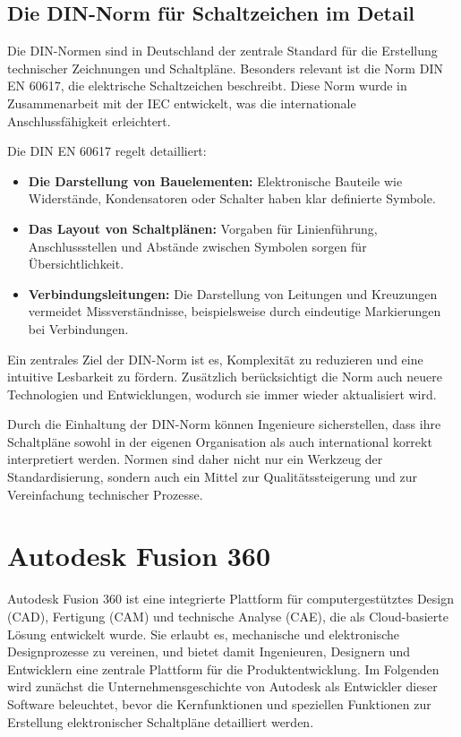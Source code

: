 \subsection*{Die DIN-Norm für Schaltzeichen im Detail}

Die DIN-Normen sind in Deutschland der zentrale Standard für die Erstellung technischer Zeichnungen und Schaltpläne. Besonders relevant ist die Norm DIN EN 60617, die elektrische Schaltzeichen beschreibt. Diese Norm wurde in Zusammenarbeit mit der IEC entwickelt, was die internationale Anschlussfähigkeit erleichtert.

Die DIN EN 60617 regelt detailliert:
\begin{itemize}
	\item \textbf{Die Darstellung von Bauelementen:} Elektronische Bauteile wie Widerstände, Kondensatoren oder Schalter haben klar definierte Symbole.
	\item \textbf{Das Layout von Schaltplänen:} Vorgaben für Linienführung, Anschlussstellen und Abstände zwischen Symbolen sorgen für Übersichtlichkeit.
	\item \textbf{Verbindungsleitungen:} Die Darstellung von Leitungen und Kreuzungen vermeidet Missverständnisse, beispielsweise durch eindeutige Markierungen bei Verbindungen.
\end{itemize}
Ein zentrales Ziel der DIN-Norm ist es, Komplexität zu reduzieren und eine intuitive Lesbarkeit zu fördern. Zusätzlich berücksichtigt die Norm auch neuere Technologien und Entwicklungen, wodurch sie immer wieder aktualisiert wird.

Durch die Einhaltung der DIN-Norm können Ingenieure sicherstellen, dass ihre Schaltpläne sowohl in der eigenen Organisation als auch international korrekt interpretiert werden. Normen sind daher nicht nur ein Werkzeug der Standardisierung, sondern auch ein Mittel zur Qualitätssteigerung und zur Vereinfachung technischer Prozesse.

\section{Autodesk Fusion 360}
\label{Autodesk}
Autodesk Fusion 360 ist eine integrierte Plattform für computergestütztes Design (CAD), Fertigung (CAM) und technische Analyse (CAE), die als Cloud-basierte Lösung entwickelt wurde. Sie erlaubt es, mechanische und elektronische Designprozesse zu vereinen, und bietet damit Ingenieuren, Designern und Entwicklern eine zentrale Plattform für die Produktentwicklung. Im Folgenden wird zunächst die Unternehmensgeschichte von Autodesk als Entwickler dieser Software beleuchtet, bevor die Kernfunktionen und speziellen Funktionen zur Erstellung elektronischer Schaltpläne detailliert werden.
